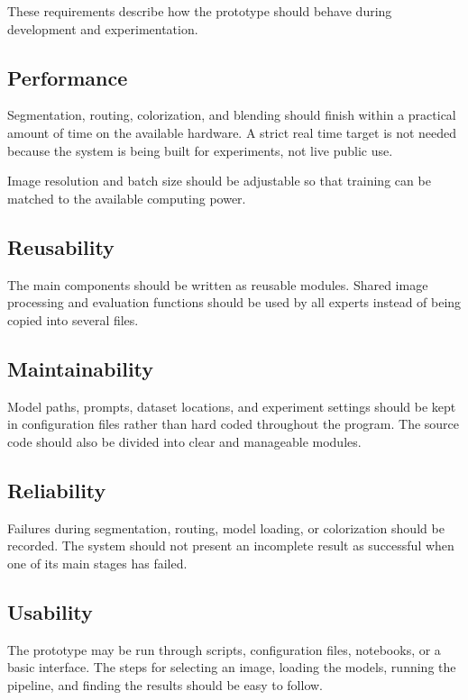 \documentclass{FastFyp}
\begin{document}
These requirements describe how the prototype should behave during development and experimentation.

\subsection{Performance}

Segmentation, routing, colorization, and blending should finish within a practical amount of time on the available hardware. A strict real time target is not needed because the system is being built for experiments, not live public use.

Image resolution and batch size should be adjustable so that training can be matched to the available computing power.

\subsection{Reusability}

The main components should be written as reusable modules. Shared image processing and evaluation functions should be used by all experts instead of being copied into several files.

\subsection{Maintainability}

Model paths, prompts, dataset locations, and experiment settings should be kept in configuration files rather than hard coded throughout the program. The source code should also be divided into clear and manageable modules.

\subsection{Reliability}

Failures during segmentation, routing, model loading, or colorization should be recorded. The system should not present an incomplete result as successful when one of its main stages has failed.

\subsection{Usability}

The prototype may be run through scripts, configuration files, notebooks, or a basic interface. The steps for selecting an image, loading the models, running the pipeline, and finding the results should be easy to follow.
\end{document}
